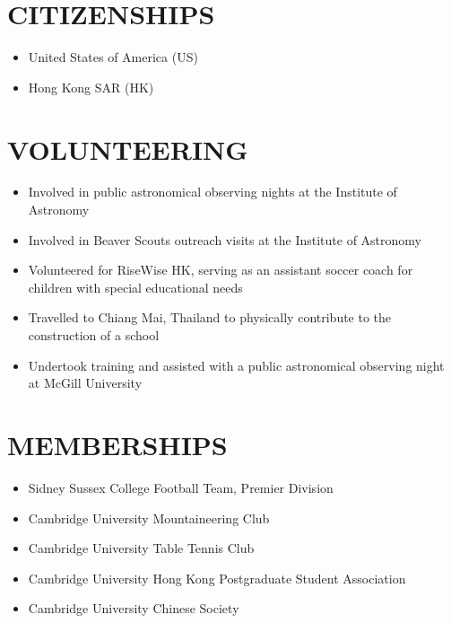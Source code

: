 \documentclass[a4paper,10pt]{extarticle}
\begin{document}
\section*{CITIZENSHIPS}
\begin{itemize}
    \item United States of America (US)

    \item Hong Kong SAR (HK)
\end{itemize}


\section*{VOLUNTEERING}
\begin{itemize}
    \item Involved in public astronomical observing nights at the Institute of Astronomy

    \item Involved in Beaver Scouts outreach visits at the Institute of Astronomy

    \item Volunteered for RiseWise HK, serving as an assistant soccer coach for children with special educational needs

    \item Travelled to Chiang Mai, Thailand to physically contribute to the construction of a school

    \item Undertook training and assisted with a public astronomical observing night at McGill University
\end{itemize}

\section*{MEMBERSHIPS}
\begin{itemize}
    \item Sidney Sussex College Football Team, Premier Division

    \item Cambridge University Mountaineering Club

    \item Cambridge University Table Tennis Club

    \item Cambridge University Hong Kong Postgraduate Student Association

    \item Cambridge University Chinese Society
\end{itemize}
\end{document}
